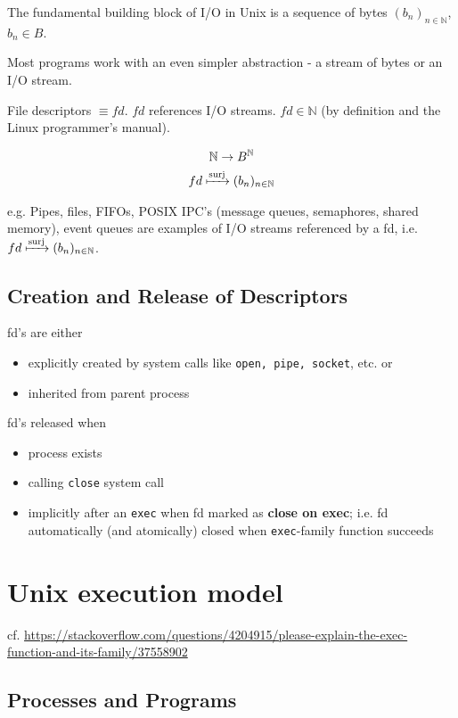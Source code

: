 \documentclass[10pt]{amsart}
\begin{document}
The fundamental building block of I/O in Unix is a sequence of bytes $(b_n)_{n\in \mathbb{N}}$, $b_n \in B$. 

Most programs work with an even simpler abstraction - a stream of bytes or an I/O stream.

File descriptors $\equiv fd$. $fd$ references I/O streams.  $fd \in \mathbb{N}$ (by definition and the Linux programmer's manual).

\[
\begin{gathered}
\mathbb{N} \to B^{\mathbb{N}} \\
fd \xmapsto{\text{surj}} (b_n)_{n \in \mathbb{N}}
\end{gathered}
\]

e.g. Pipes, files, FIFOs, POSIX IPC's (message queues, semaphores, shared memory), event queues are examples of I/O streams referenced by a fd, i.e. $fd \xmapsto{\text{surj}} (b_n)_{n \in \mathbb{N}}$.

\subsection{Creation and Release of Descriptors}

fd's are either 
\begin{itemize}
	\item explicitly created by system calls like \texttt{open, pipe, socket}, etc. or 
	\item inherited from parent process
\end{itemize}

fd's released when
\begin{itemize}
	\item process exists
	\item calling \texttt{close} system call
	\item implicitly after an \texttt{exec} when fd marked as \textbf{close on exec}; i.e. fd automatically (and atomically) closed when \texttt{exec}-family function succeeds
\end{itemize}

\section{Unix execution model}

cf. \url{https://stackoverflow.com/questions/4204915/please-explain-the-exec-function-and-its-family/37558902}

\subsection{Processes and Programs}
\end{document}
